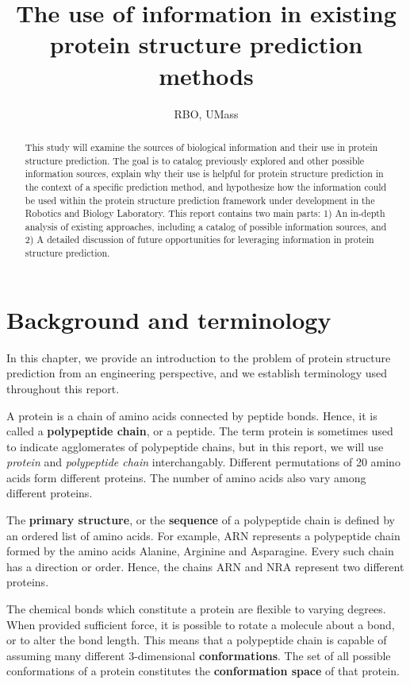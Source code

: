 \documentclass[10pt]{report}
\title{The use of information in existing protein structure prediction methods}
\author{RBO, UMass}
\begin{document}
\maketitle
\tableofcontents

\begin{abstract}
This study will examine the sources of biological information and their use in protein structure prediction. The goal is to catalog previously explored and other possible information sources, explain why their use is helpful for protein structure prediction in the context of a specific prediction method, and hypothesize how the information could be used within the protein structure prediction framework under development in the Robotics and Biology Laboratory. This report contains two main parts: 1) An in-depth analysis of existing approaches, including a catalog of possible information sources, and 2) A detailed discussion of future opportunities for leveraging information in protein structure prediction.
\end{abstract}

\chapter{Background and terminology}

In this chapter, we provide an introduction to the problem of protein structure prediction from an engineering perspective, and we establish terminology used throughout this report.

A protein is a chain of amino acids connected by peptide bonds. Hence, it is called a \textbf{polypeptide chain}, or a peptide. The term protein is sometimes used to indicate agglomerates of polypeptide chains, but in this report, we will use \textit{protein} and \textit{polypeptide chain} interchangably. Different permutations of 20 amino acids form different proteins. The number of amino acids also vary among different proteins.

The \textbf{primary structure}, or the \textbf{sequence} of a polypeptide chain is defined by an ordered list of amino acids. For example, ARN represents a polypeptide chain formed by the amino acids Alanine, Arginine and Asparagine. Every such chain has a direction or order. Hence, the chains ARN and NRA represent two different proteins.

The chemical bonds which constitute a protein are flexible to varying degrees. When provided sufficient force, it is possible to rotate a molecule about a bond, or to alter the bond length. This means that a polypeptide chain is capable of assuming many different 3-dimensional \textbf{conformations}. The set of all possible conformations of a protein constitutes the \textbf{conformation space} of that protein.
\end{document}
